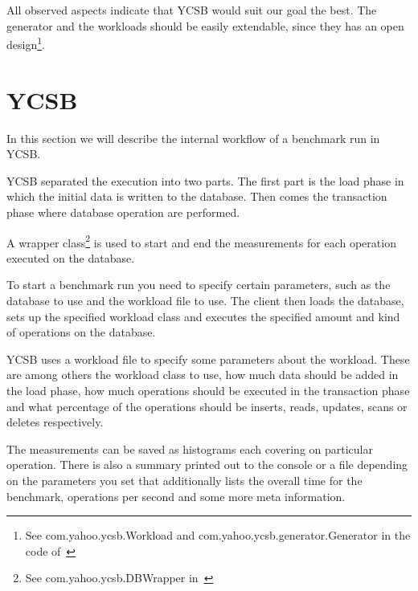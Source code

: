 All observed aspects indicate that YCSB would suit our goal the best.
The generator and the workloads should be easily extendable, since they has an open design\footnote{See com.yahoo.ycsb.Workload and com.yahoo.ycsb.generator.Generator in the code of~\cite{Cooper}}.

\section{YCSB}
\label{ch:analysis:se:ycsb}

In this section we will describe the internal workflow of a benchmark run in YCSB.

YCSB separated the execution into two parts.
The first part is the load phase in which the initial data is written to the database.
Then comes the transaction phase where database operation are performed.

A wrapper class\footnote{See com.yahoo.ycsb.DBWrapper in~\cite{Cooper}} is used to start and end the measurements for each operation executed on the database.

To start a benchmark run you need to specify certain parameters,
such as the database to use and the workload file to use.
The client then loads the database,
sets up the specified workload class and executes the specified amount and kind of operations on the database.

YCSB uses a workload file to specify some parameters about the workload.
These are among others the workload class to use,
how much data should be added in the load phase,
how much operations should be executed in the transaction phase and what percentage of the operations should be inserts, reads, updates, scans or deletes respectively.

The measurements can be saved as histograms each covering on particular operation.
There is also a summary printed out to the console or a file depending on the parameters you set that additionally lists the overall time for the benchmark, operations per second and some more meta information.

